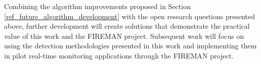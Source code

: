 Combining the algorithm improvements proposed in Section \ref{ref_future_algorithm_development} with the open research questions presented above, further development will create solutions that demonstrate the practical value of this work and the FIREMAN project. Subsequent work will focus on using the detection methodologies presented in this work and implementing them in pilot real-time monitoring applications through the FIREMAN project.
